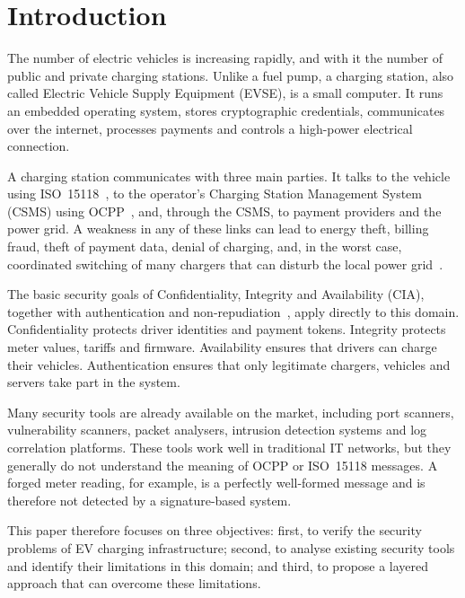 \documentclass[runningheads]{llncs}
\begin{document}
\section{Introduction}
The number of electric vehicles is increasing rapidly, and with it the number of public and private charging stations. Unlike a fuel pump, a charging station, also called Electric Vehicle Supply Equipment (EVSE), is a small computer. It runs an embedded operating system, stores cryptographic credentials, communicates over the internet, processes payments and controls a high-power electrical connection.

A charging station communicates with three main parties. It talks to the vehicle using ISO~15118~\cite{iso15118}, to the operator's Charging Station Management System (CSMS) using OCPP~\cite{ocpp201}, and, through the CSMS, to payment providers and the power grid. A weakness in any of these links can lead to energy theft, billing fraud, theft of payment data, denial of charging, and, in the worst case, coordinated switching of many chargers that can disturb the local power grid~\cite{johnson2022review,antoun2020detailed}.

The basic security goals of Confidentiality, Integrity and Availability (CIA), together with authentication and non-repudiation~\cite{stallings2017}, apply directly to this domain. Confidentiality protects driver identities and payment tokens. Integrity protects meter values, tariffs and firmware. Availability ensures that drivers can charge their vehicles. Authentication ensures that only legitimate chargers, vehicles and servers take part in the system.

Many security tools are already available on the market, including port scanners, vulnerability scanners, packet analysers, intrusion detection systems and log correlation platforms. These tools work well in traditional IT networks, but they generally do not understand the meaning of OCPP or ISO~15118 messages. A forged meter reading, for example, is a perfectly well-formed message and is therefore not detected by a signature-based system.

This paper therefore focuses on three objectives: first, to verify the security problems of EV charging infrastructure; second, to analyse existing security tools and identify their limitations in this domain; and third, to propose a layered approach that can overcome these limitations.
\end{document}
